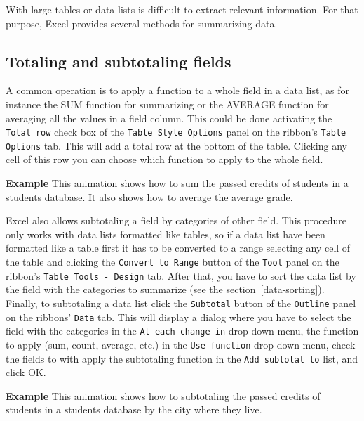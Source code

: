 With large tables or data lists is difficult to extract relevant information. For that purpose, Excel provides several methods for summarizing data.

\subsection{Totaling and subtotaling fields}\hypertarget{totaling-and-subtotaling-fields}{}\label{totaling-and-subtotaling-fields}

A common operation is to apply a function to a whole field in a data list, as for instance the SUM function for summarizing or the AVERAGE function for averaging all the values in a field column. This could be done activating the \texttt{Total row} check box of the \texttt{Table Style Options} panel on the ribbon's \texttt{Table Options} tab. This will add a total row at the bottom of the table. Clicking any cell of this row you can choose which function to apply to the whole field.

\textbf{Example} This \href{http://aprendeconalf.es/office/excel/manual/img/example_field_summarizing.gif}{animation} shows how to sum the passed credits of students in a students database. It also shows how to average the average grade.

Excel also allows subtotaling a field by categories of other field. This procedure only works with data lists formatted
like tables, so if a data list have been formatted like a table first it has to be converted to a range selecting any
cell of the table and clicking the \texttt{Convert to Range} button of the \texttt{Tool} panel on the ribbon's
\texttt{Table Tools - Design} tab. After that, you have to sort the data list by the field with the categories to
summarize (see the section~\ref{data-sorting}). Finally, to subtotaling a data list click the \texttt{Subtotal} button
of the \texttt{Outline} panel on the ribbons' \texttt{Data} tab. This will display a dialog where you have to select the field with the categories in the \texttt{At each change in} drop-down menu, the function to apply (sum, count, average, etc.) in the \texttt{Use function} drop-down menu, check the fields to with apply the subtotaling function in the \texttt{Add subtotal to} list, and click OK.

\textbf{Example} This \href{http://aprendeconalf.es/office/excel/manual/img/example_field_subtotaling.gif}{animation} shows how to subtotaling the passed credits of students in a students database by the city where they live.

